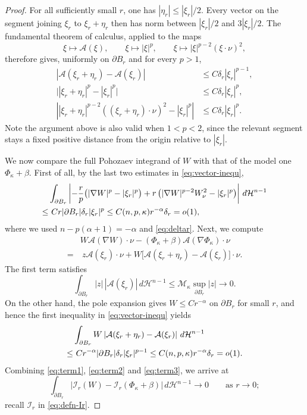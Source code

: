 \documentclass[reqno,12pt]{amsart}
\numberwithin{equation}{section}
\theoremstyle{remark}
\newcommand{\dd}{\,d}
\newcommand{\Acal}{\mathcal A}
\begin{document}
\begin{proof}
For all sufficiently small $r$, one has
$|\eta_r|\le |\xi_r|/2$.  Every vector on the segment joining
$\xi_r$ to $\xi_r+\eta_r$ then has norm between
$|\xi_r|/2$ and $3|\xi_r|/2$.  The fundamental theorem of calculus, applied to the maps
$$
\xi\mapsto\Acal(\xi), \qquad \xi\mapsto|\xi|^p,
\qquad  \xi\mapsto|\xi|^{p-2}(\xi\cdot\nu)^2,
$$
therefore gives, uniformly on $\partial B_r$ and for every $p>1$,
\begin{equation}\label{eq:vector-inequ}
\begin{aligned}
 |\Acal(\xi_r+\eta_r)-\Acal(\xi_r)|
 &\le C\delta_r|\xi_r|^{p-1},\\
 \bigl||\xi_r+\eta_r|^p-|\xi_r|^p\bigr|
 &\le C\delta_r|\xi_r|^p,\\
 \left|
 |\xi_r+\eta_r|^{p-2}
 ((\xi_r+\eta_r)\cdot\nu)^2
 -|\xi_r|^p
 \right|
 &\le C\delta_r|\xi_r|^p.
\end{aligned}
\end{equation}
Note the argument above is also valid when $1<p<2$, since the relevant segment stays a fixed positive distance from the origin relative to $|\xi_r|$.

We now compare the full Pohozaev integrand of $W$ with that of the model one $\Phi_\kappa+\beta$. 
First of all, by the last two estimates in \eqref{eq:vector-inequ},
\begin{align}
&\int_{\partial B_r}
\left| -\frac r p\bigl(|\nabla W|^p-|\xi_r|^p\bigr)
 +r\left( |\nabla W|^{p-2}W_\nu^2-|\xi_r|^p
 \right)\right|\dd \mathcal H^{n-1}\notag\\
 \le& \ Cr|\partial B_r|\delta_r|\xi_r|^p
\le C(n,p,\kappa)r^{-\alpha}\delta_r =o(1), \label{eq:term1}
\end{align}
where we used
$n-p(\alpha+1)=-\alpha$ and \eqref{eq:deltar}.
Next, we compute
\begin{align*}
&W\Acal(\nabla W)\cdot\nu
-(\Phi_\kappa+\beta) \Acal(\nabla\Phi_\kappa)\cdot\nu\\
 =&\ z\Acal(\xi_r)\cdot\nu
 +W\bigl[ \Acal(\xi_r+\eta_r)-\Acal(\xi_r) \bigr]\cdot\nu.
\end{align*}
The first term satisfies
\begin{equation}\label{eq:term2}
  \int_{\partial B_r}|z|\,|\Acal(\xi_r)|\dd \mathcal H^{n-1}
\le \mathcal M_\kappa\sup_{\partial B_r}|z| \to 0.  
\end{equation}
On the other hand, the pole expansion gives $W\le Cr^{-\alpha}$ on $\partial B_r$ for small $r$, and hence the first inequality in \eqref{eq:vector-inequ} yields
\begin{align}
&\int_{\partial B_r}
W\left|\Acal(\xi_r+\eta_r)-\Acal(\xi_r) \right|\dd \mathcal H^{n-1}\notag\\
\le& \ Cr^{-\alpha}|\partial B_r| \delta_r|\xi_r|^{p-1}
\le C(n,p,\kappa)r^{-\alpha}\delta_r =o(1). \label{eq:term3}
\end{align}
Combining \eqref{eq:term1}, \eqref{eq:term2} and \eqref{eq:term3}, we arrive at
\begin{equation}\label{eq:full-pohozaev-comparison}
\int_{\partial B_r}
\left|\mathcal I_r(W)-\mathcal I_r(\Phi_\kappa+\beta) \right|\dd \mathcal H^{n-1} \to 0
\qquad\text{as }r\to 0;
\end{equation}
recall $\mathcal I_r$ in \eqref{eq:defn-Ir}.


\end{proof}
\end{document}
